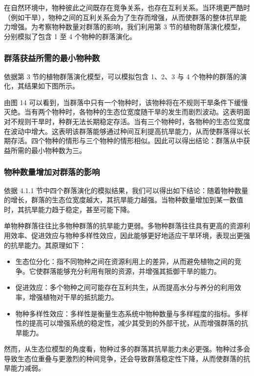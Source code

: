 \documentclass[11pt,a4paper]{ctexart}
\begin{document}
在自然环境中，物种彼此之间既存在竞争关系，也存在互利关系。当环境更严酷时（例如干旱），物种之间的互利关系会为了生存而增强，从而使群落的整体抗旱能力增强。为考察物种数量对群落的影响，我们利用第 3 节的植物群落演化模型，分别模拟了包含 1 至 4 个物种的群落演化。

\subsubsection{群落获益所需的最小物种数}

依据第 3 节的植物群落演化模型，可以模拟包含 1、2、3 与 4 个物种的群落的演化，其结果如下图所示。

由图 14 可以看到，当群落中只有一个物种时，该物种将在不规则干旱条件下缓慢灭绝。当有两个物种时，各物种的生态位宽度随干旱的发生而剧烈波动。这表明面对不规则干旱时，种群无法长期稳定存活。当有三个物种时，各物种的生态位宽度在波动中增大。这表明该群落能够通过种间互利提高抗旱能力，从而使群落得以长期存活。四个物种的情形与三个物种的情形相似。因此可以得出结论：群落从中获益所需的最小物种数为三。

\subsubsection{物种数量增加对群落的影响}

依据 4.1.1 节中四个群落演化的模拟结果，我们可以得出如下结论：随着物种数量的增长，群落的生态位宽度越大，其抗旱能力越强。当物种数量增加到某一数值时，其抗旱能力趋于稳定，甚至可能下降。

单物种群落往往比多物种群落的抗旱能力更弱。多物种群落往往具有更高的资源利用效率、促进效应与物种多样性效应，因此能够更好地适应干旱环境，表现出更强的抗旱能力。其原理如下：

\begin{itemize}
\item 生态位分化：指不同物种之间在资源利用上的差异，从而避免植物之间的竞争。它使群落能够充分利用有限的资源，并增强其抵御干旱的能力。
\item 促进效应：多个物种之间可能存在互利共生，从而提高水分与养分的利用效率，增强植物对干旱的抵抗能力。
\item 物种多样性效应：多样性是衡量生态系统中物种数量与多样程度的指标。多样性的提高可以增强系统的稳定性，减少其受到的外部干扰，从而增强群落的抗旱能力。
\end{itemize}

然而，从生态位模型的角度看，物种过多的群落其抗旱能力未必更强。物种过多会导致生态位重叠与更激烈的种间竞争，还会导致群落稳定性下降，从而使群落的抗旱能力减弱。
\end{document}
